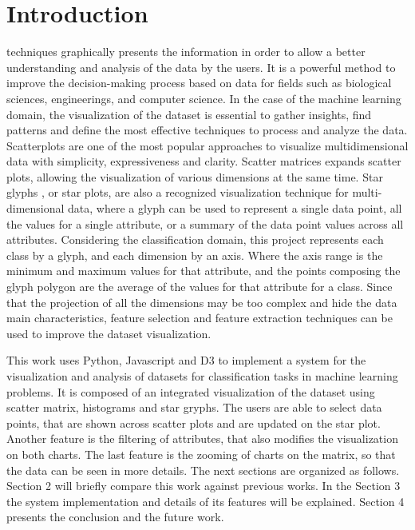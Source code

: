 \documentclass[journal]{IEEEtran}
\begin{document}
\section{Introduction}
% 
% 
% 
% 
 techniques graphically presents the information in order to allow a better understanding and analysis of the data by the users. It is a powerful method to improve the decision-making process based on data for fields such as biological sciences, engineerings, and computer science. In the case of the machine learning domain, the visualization of the dataset is essential to gather insights, find patterns and define the most effective techniques to process and analyze the data. Scatterplots \cite{utts2014seeing} are one of the most popular approaches to visualize multidimensional data with simplicity, expressiveness and clarity. Scatter matrices \cite{carr1987scatterplot} expands scatter plots, allowing the visualization of various dimensions at the same time. Star glyphs \cite{ward2008multivariate}, or star plots, are also a recognized visualization technique for multi-dimensional data, where a glyph can be used to represent a single data point, all the values for a single attribute, or a summary of the data point values across all attributes. Considering the classification domain, this project represents each class by a glyph, and each dimension by an axis. Where the axis range is the minimum and maximum values for that attribute, and the points composing the glyph polygon are the average of the values for that attribute for a class. Since that the projection of all the dimensions may be too complex and hide the data main characteristics, feature selection and feature extraction techniques \cite{lewis1992feature} can be used to improve the dataset visualization. 

This work uses Python, Javascript and D3 to implement a system for the visualization and analysis of datasets for classification tasks in machine learning problems. It is composed of an integrated visualization of the dataset using scatter matrix, histograms and star gryphs. The users are able to select data points, that are shown across scatter plots and are updated on the star plot. Another feature is the filtering of attributes, that also modifies the visualization on both charts. The last feature is the zooming of charts on the matrix, so that the data can be seen in more details. The next sections are organized as follows. Section 2 will briefly compare this work against previous works. In the Section 3 the system implementation and details of its features will be explained. Section 4 presents the conclusion and the future work.
\end{document}
